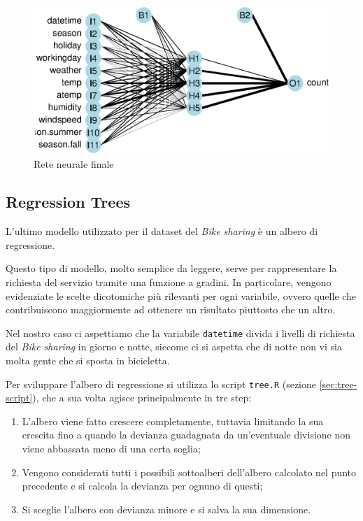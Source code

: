 \begin{figure}[H]
  \centering
  \includegraphics[width=.7\columnwidth]{images/non-linear/neural-network.eps}
  \caption{Rete neurale finale}
  \label{fig:nnet}
\end{figure}


\subsection{Regression Trees}\label{sec:trees}
L'ultimo modello utilizzato per il dataset del \emph{Bike sharing} è un albero
di regressione.

Questo tipo di modello, molto semplice da leggere, serve per rappresentare la
richiesta del servizio tramite una funzione a gradini.
In particolare, vengono evidenziate le scelte dicotomiche più rilevanti per
ogni variabile, ovvero quelle che contribuiscono maggiormente ad ottenere un
risultato piuttosto che un altro.

Nel nostro caso ci aspettiamo che la variabile \texttt{datetime} divida i
livelli di richiesta del \emph{Bike sharing} in giorno e notte, siccome ci
si aspetta che di notte non vi sia molta gente che si sposta in bicicletta.

Per sviluppare l'albero di regressione si utilizza lo script \texttt{tree.R}
(sezione \ref{sec:tree-script}), che a sua volta agisce principalmente in tre
step:

\begin{enumerate}
\item L'albero viene fatto crescere completamente, tuttavia limitando la sua
  crescita fino a quando la devianza guadagnata da un'eventuale divisione non
  viene abbassata meno di una certa soglia;
\item Vengono considerati tutti i possibili sottoalberi dell'albero calcolato
  nel punto precedente e si calcola la devianza per ognuno di questi;
\item Si sceglie l'albero con devianza minore e si salva la sua dimensione.
\end{enumerate}

